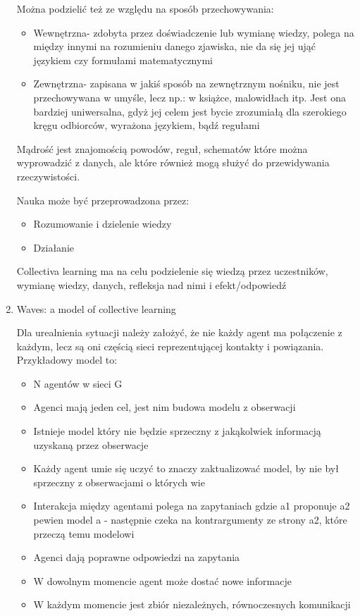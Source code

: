 \documentclass[11pt]{aghdpl}
\begin{document}
\begin{enumerate}
Można podzielić też ze względu na sposób przechowywania:

\begin{itemize}
        \item Wewnętrzna- zdobyta przez doświadczenie lub wymianę wiedzy, polega na między innymi na rozumieniu danego zjawiska, nie da się jej ująć językiem czy formułami matematycznymi
        \item Zewnętrzna- zapisana w jakiś sposób na zewnętrznym nośniku, nie jest przechowywana w umyśle, lecz np.: w książce, malowidłach itp. Jest ona bardziej uniwersalna, gdyż jej celem jest bycie zrozumiałą dla szerokiego kręgu odbiorców, wyrażona językiem, bądź regułami
\end{itemize}

Mądrość jest znajomością powodów, reguł, schematów które można wyprowadzić z danych, ale które również mogą służyć do przewidywania rzeczywistości.

Nauka może być przeprowadzona przez:
\begin{itemize}
        \item Rozumowanie i dzielenie wiedzy
        \item Działanie
\end{itemize}

Collectiva learning ma na celu podzielenie się wiedzą przez uczestników, wymianę wiedzy, danych, refleksja nad nimi i efekt/odpowiedź

\item Waves: a model of collective learning \cite{WavesModelOfCollectiveLearning}

Dla urealnienia sytuacji należy założyć, że nie każdy agent ma połączenie z każdym, lecz są oni częścią sieci reprezentującej kontakty i powiązania.
Przykładowy model to:

\begin{itemize}
        \item N agentów w sieci G
        \item Agenci mają jeden cel, jest nim budowa modelu z obserwacji
        \item Istnieje model który nie będzie sprzeczny z jakąkolwiek informacją uzyskaną przez obserwacje
        \item Każdy agent umie się uczyć to znaczy zaktualizować model, by nie był sprzeczny z obserwacjami o których wie
        \item Interakcja między agentami polega na zapytaniach gdzie a1 proponuje a2 pewien model a - następnie czeka na kontrargumenty ze strony a2, które przeczą temu modelowi
        \item Agenci dają poprawne odpowiedzi na zapytania
        \item W dowolnym momencie agent może dostać nowe informacje
        \item W każdym momencie jest zbiór niezależnych, równoczesnych komunikacji
\end{itemize}


\end{enumerate}
\end{document}
